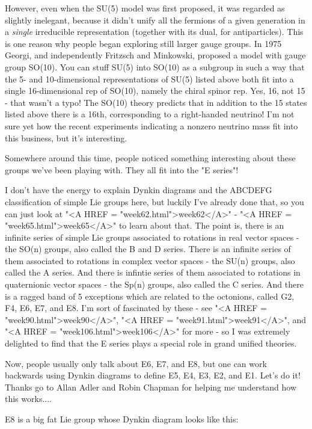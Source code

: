 However, even when the SU(5) model was first proposed, it was regarded
as slightly inelegant, because it didn't unify all the fermions of a
given generation in a \emph{single} irreducible representation (together
with its dual, for antiparticles).  This is one reason why people
began exploring still larger gauge groups.  In 1975 Georgi, and
independently Fritzsch and Minkowski, proposed a model with gauge
group SO(10).  You can stuff SU(5) into SO(10) as a subgroup in such a
way that the 5- and 10-dimensional representations of SU(5) listed
above both fit into a single 16-dimensional rep of SO(10), namely the
chiral spinor rep.  Yes, 16, not 15 - that wasn't a typo!  The SO(10)
theory predicts that in addition to the 15 states listed above there
is a 16th, corresponding to a right-handed neutrino!  I'm not sure yet
how the recent experiments indicating a nonzero neutrino mass fit into
this business, but it's interesting.  

Somewhere around this time, people noticed something interesting about
these groups we've been playing with.  They all fit into the "E series"!

I don't have the energy to explain Dynkin diagrams and the ABCDEFG
classification of simple Lie groups here, but luckily I've already
done that, so you can just look at "<A HREF = "week62.html">week62</A>" - "<A HREF = "week65.html">week65</A>" to learn about
that.  The point is, there is an infinite series of simple Lie groups
associated to rotations in real vector spaces - the SO(n) groups, also
called the B and D series.  There is an infinite series of them
associated to rotations in complex vector spaces - the SU(n) groups,
also called the A series.  And there is infintie series of them
associated to rotations in quaternionic vector spaces - the Sp(n)
groups, also called the C series.  And there is a ragged band of 5
exceptions which are related to the octonions, called G2, F4, E6, E7,
and E8.  I'm sort of fascinated by these - see "<A HREF = "week90.html">week90</A>", "<A HREF = "week91.html">week91</A>", and
"<A HREF = "week106.html">week106</A>" for more - so I was extremely delighted to find that the E
series plays a special role in grand unified theories.

Now, people usually only talk about E6, E7, and E8, but one can work
backwards using Dynkin diagrams to define E5, E4, E3, E2, and E1.
Let's do it!  Thanks go to Allan Adler and Robin Chapman for helping
me understand how this works....

E8 is a big fat Lie group whose Dynkin diagram looks like this:


